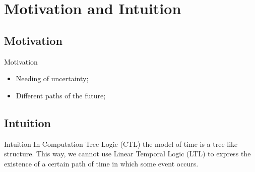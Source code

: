 \section{Motivation and Intuition}
\subsection{Motivation}
\begin{frame}{Motivation}
	\begin{itemize}
		\item 
		{
			Needing of uncertainty;
			\pause
		} 
		\item 
		{
			Different paths of the future;
		}
	\end{itemize}
\end{frame}
\subsection{Intuition}
\begin{frame}{Intuition}
	In Computation Tree Logic (CTL) the model of time is a tree-like structure. This way, we cannot use Linear Temporal Logic (LTL) to express the existence of a certain path of time in which some event occurs.
\end{frame}